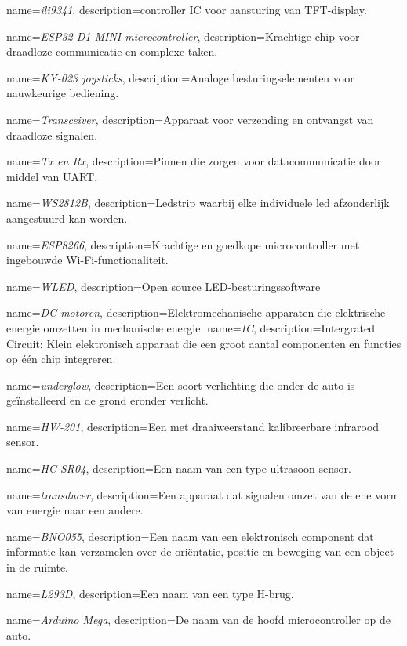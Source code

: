 {
    name=\textit{ili9341},
    description={controller IC voor aansturing van TFT-display.}
}

{
    name=\textit{ESP32 D1 MINI microcontroller},
    description={Krachtige chip voor draadloze communicatie en complexe taken.}
}

{
    name=\textit{KY-023 joysticks},
    description={Analoge besturingselementen voor nauwkeurige bediening.}
}

{
    name=\textit{Transceiver},
    description={Apparaat voor verzending en ontvangst van draadloze signalen.}
}

{
    name=\textit{Tx en Rx},
    description={Pinnen die zorgen voor datacommunicatie door middel van UART.}
}

{
    name=\textit{WS2812B},
    description={Ledstrip waarbij elke individuele led afzonderlijk aangestuurd kan worden.}
}

{
    name=\textit{ESP8266},
    description={Krachtige en goedkope microcontroller met ingebouwde Wi-Fi-functionaliteit.}
}

{
    name=\textit{WLED},
    description={Open source LED-besturingssoftware}
}

{
    name=\textit{DC motoren},
    description={Elektromechanische apparaten die elektrische energie omzetten in mechanische energie.}
}
{
    name=\textit{IC},
    description={Intergrated Circuit: Klein elektronisch apparaat die een groot aantal componenten en functies op één chip integreren.}
}

{
    name=\textit{underglow},
    description={Een soort verlichting die onder de auto is geïnstalleerd en de grond eronder verlicht.}
}

{
    name=\textit{HW-201},
    description={Een met draaiweerstand kalibreerbare infrarood sensor.}
}

{
    name=\textit{HC-SR04},
    description={Een naam van een type ultrasoon sensor.}
}

{
    name=\textit{transducer},
    description={Een apparaat dat signalen omzet van de ene vorm van energie naar een andere.}
}

{
    name=\textit{BNO055},
    description={Een naam van een elektronisch component dat informatie kan verzamelen over de oriëntatie, positie en beweging van een object in de ruimte.}
}

{
    name=\textit{L293D},
    description={Een naam van een type H-brug.}
}

{
    name=\textit{Arduino Mega},
    description={De naam van de hoofd microcontroller op de auto.}
}